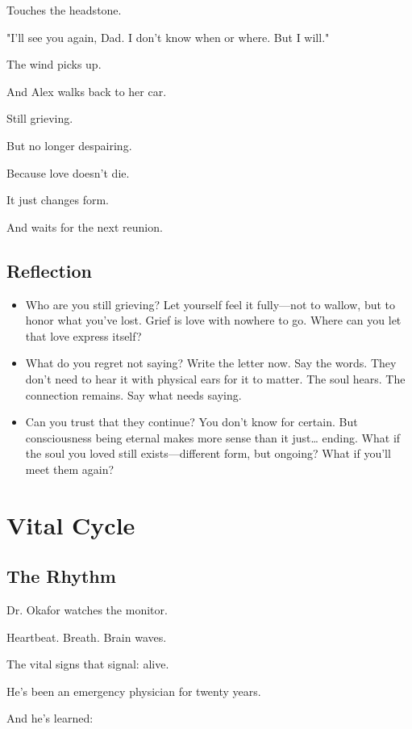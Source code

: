 \documentclass[11pt,twoside]{book}
\begin{document}
Touches the headstone.

"I'll see you again, Dad. I don't know when or where. But I will."

The wind picks up.

And Alex walks back to her car.

Still grieving.

But no longer despairing.

Because love doesn't die.

It just changes form.

And waits for the next reunion.

\section*{Reflection}

\begin{itemize}
\item Who are you still grieving? Let yourself feel it fully—not to wallow, but to honor what you've lost. Grief is love with nowhere to go. Where can you let that love express itself?
\item What do you regret not saying? Write the letter now. Say the words. They don't need to hear it with physical ears for it to matter. The soul hears. The connection remains. Say what needs saying.
\item Can you trust that they continue? You don't know for certain. But consciousness being eternal makes more sense than it just\ldots{} ending. What if the soul you loved still exists—different form, but ongoing? What if you'll meet them again?
\end{itemize}

\chapter{Vital Cycle}

\section*{The Rhythm}

Dr. Okafor watches the monitor.

Heartbeat. Breath. Brain waves.

The vital signs that signal: alive.

He's been an emergency physician for twenty years.

And he's learned:
\end{document}
